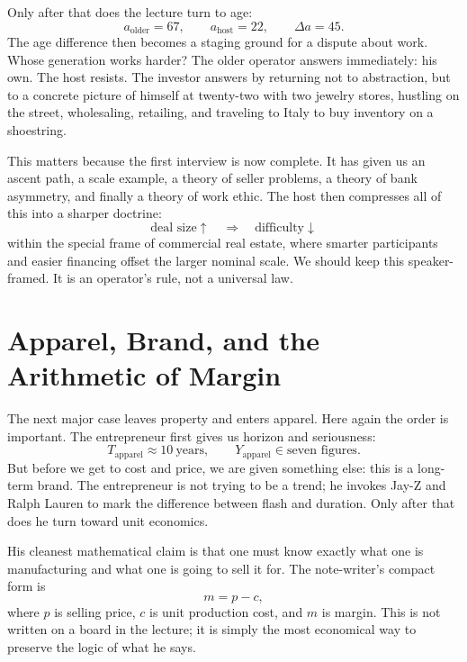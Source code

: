 Only after that does the lecture turn to age:
\begin{equation}
a_{\text{older}} = 67,\qquad
a_{\text{host}} = 22,\qquad
\Delta a = 45.
\end{equation}
The age difference then becomes a staging ground for a dispute about work. Whose generation works harder? The older operator answers immediately: his own. The host resists. The investor answers by returning not to abstraction, but to a concrete picture of himself at twenty-two with two jewelry stores, hustling on the street, wholesaling, retailing, and traveling to Italy to buy inventory on a shoestring.

This matters because the first interview is now complete. It has given us an ascent path, a scale example, a theory of seller problems, a theory of bank asymmetry, and finally a theory of work ethic. The host then compresses all of this into a sharper doctrine:
\begin{equation}
\text{deal size} \uparrow \quad \Rightarrow \quad \text{difficulty} \downarrow
\end{equation}
within the special frame of commercial real estate, where smarter participants and easier financing offset the larger nominal scale. We should keep this speaker-framed. It is an operator's rule, not a universal law.

\section{Apparel, Brand, and the Arithmetic of Margin}

The next major case leaves property and enters apparel. Here again the order is important. The entrepreneur first gives us horizon and seriousness:
\begin{equation}
T_{\text{apparel}} \approx 10\ \text{years},\qquad
Y_{\text{apparel}} \in \text{seven figures}.
\end{equation}
But before we get to cost and price, we are given something else: this is a long-term brand. The entrepreneur is not trying to be a trend; he invokes Jay-Z and Ralph Lauren to mark the difference between flash and duration. Only after that does he turn toward unit economics.

His cleanest mathematical claim is that one must know exactly what one is manufacturing and what one is going to sell it for. The note-writer's compact form is
\begin{equation}
m = p - c,
\end{equation}
where \(p\) is selling price, \(c\) is unit production cost, and \(m\) is margin. This is not written on a board in the lecture; it is simply the most economical way to preserve the logic of what he says.

